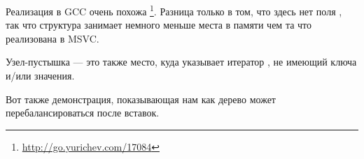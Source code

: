 



Реализация в GCC очень похожа
\footnote{\url{http://go.yurichev.com/17084}}.
Разница только в том, что здесь нет поля ,
так что структура занимает немного меньше места в памяти чем та что реализована в MSVC.

Узел-пустышка --- это также место, куда указывает итератор , не имеющий ключа и/или значения.


Вот также демонстрация, показывающая нам как дерево может перебалансироваться после вставок.





